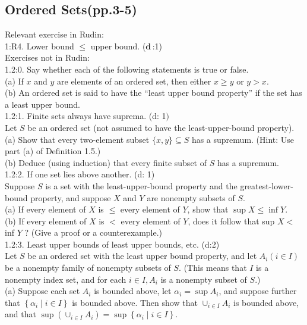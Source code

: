 \documentclass[12pt]{ctexart}
\theoremstyle{definition}
\theoremstyle{plain}
\theoremstyle{remark}
\begin{document}
\subsection{Ordered Sets(pp.3-5)}
\noindent Relevant exercise in Rudin:   
\\ 1:R4. Lower bound \(\leq\) upper bound. (\(\mathbf{d}\, \):1)
\\[7pt]
 Exercises not in Rudin:
\\ 1.2:0. Say whether each of the following statements is true or false.
\\ (a) If \(x\) and \(y\) are elements of an ordered set, then either \(x \geq y\) or \(y>x\).
\\ (b) An ordered set is said to have the ``least upper bound property'' if the set has a least upper bound.
\\ 1.2:1. Finite sets always have suprema. (d: 1\()\)
\\ Let \(S\) be an ordered set (not assumed to have the least-upper-bound property).
\\ (a) Show that every two-element subset \(\{x, y\} \subseteq S\) has a supremum. (Hint: Use part (a) of Definition 1.5.)
\\ (b) Deduce (using induction) that every finite subset of \(S\) has a supremum.
\\ 1.2:2. If one set lies above another. (d: 1)
\\ Suppose \(S\) is a set with the least-upper-bound property and the greatest-lower-bound property, and suppose \(X\) and \(Y\) are nonempty subsets of \(S\).
\\ (a) If every element of \(X\) is \(\leq\) every element of \(Y\), show that \(\sup X \leq \inf Y\).
\\ (b) If every element of \(X\) is \(<\) every element of \(Y\), does it follow that sup \(X<\) inf \(Y\) ? (Give a proof or a counterexample.)
\\ 1.2:3. Least upper bounds of least upper bounds, etc. (d:2)
\\ Let \(S\) be an ordered set with the least upper bound property, and let \(A_i(i \in I)\) be a nonempty family of nonempty subsets of \(S\). (This means that \(I\) is a nonempty index set, and for each \(i \in I, A_i\) is a nonempty subset of \(S\).)
\\ (a) Suppose each set \(A_i\) is bounded above, let \(\alpha_i=\sup A_i\), and suppose further that \(\left\{\alpha_i \mid i \in I\right\}\) is bounded above. Then show that \(\cup_{i \in I} A_i\) is bounded above, and that \(\sup \left(\cup_{i \in I} A_i\right)=\sup \left\{\alpha_i \mid i \in I\right\}\).
\end{document}
